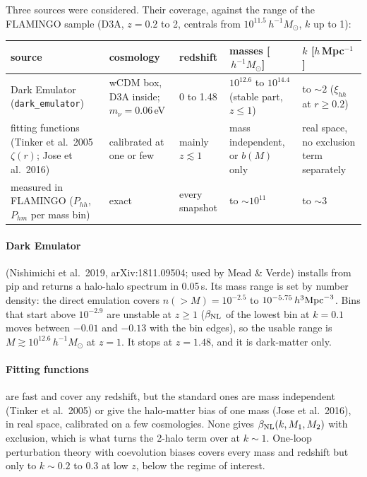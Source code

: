 \documentclass[11pt]{article}
\newcommand{\Msun}{\,h^{-1}M_\odot}
\newcommand{\bNL}{\beta_{\rm NL}}
\begin{document}
Three sources were considered. Their coverage, against the range of the FLAMINGO sample
(D3A, $z = 0.2$ to 2, centrals from $10^{11.5}\Msun$, $k$ up to 1):

\begin{center}\small
\begin{tabular}{p{2.6cm}p{2.5cm}p{1.9cm}p{3.1cm}p{1.9cm}}
\toprule
source & cosmology & redshift & masses [$\Msun$] & $k$ [$h\,$Mpc$^{-1}$] \\
\midrule
Dark Emulator (\texttt{dark\_emulator}) & wCDM box, D3A inside; $m_\nu = 0.06$\,eV & 0 to 1.48 & $10^{12.6}$ to $10^{14.4}$ (stable part, $z \le 1$) & to $\sim 2$ ($\xi_{hh}$ at $r \ge 0.2$) \\
fitting functions (Tinker et al.\ 2005 $\zeta(r)$; Jose et al.\ 2016) & calibrated at one or few & mainly $z \lesssim 1$ & mass independent, or $b(M)$ only & real space, no exclusion term separately \\
measured in FLAMINGO ($P_{hh}$, $P_{hm}$ per mass bin) & exact & every snapshot & to $\sim 10^{11}$ & to $\sim 3$ \\
\bottomrule
\end{tabular}
\end{center}

\paragraph{Dark Emulator} (Nishimichi et al.\ 2019, arXiv:1811.09504; used by
Mead \& Verde) installs from pip and returns a halo-halo spectrum in 0.05\,s.
Its mass range is set by number density: the direct emulation covers
$n(>M) = 10^{-2.5}$ to $10^{-5.75}\,h^3{\rm Mpc}^{-3}$. Bins that start above
$10^{-2.9}$ are unstable at $z \ge 1$ ($\bNL$ of the lowest bin at $k = 0.1$
moves between $-0.01$ and $-0.13$ with the bin edges), so the usable range is
$M \gtrsim 10^{12.6}\Msun$ at $z = 1$. It stops at $z = 1.48$, and it is
dark-matter only.

\paragraph{Fitting functions} are fast and cover any redshift, but the
standard ones are mass independent (Tinker et al.\ 2005) or give the
halo-matter bias of one mass (Jose et al.\ 2016), in real space, calibrated on
a few cosmologies. None gives $\bNL(k, M_1, M_2)$ with exclusion, which is
what turns the 2-halo term over at $k \sim 1$. One-loop perturbation theory
with coevolution biases covers every mass and redshift but only to
$k \sim 0.2$ to 0.3 at low $z$, below the regime of interest.
\end{document}

